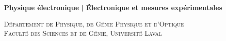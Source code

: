 %
\begin{center}
    \textbf{\large{Physique électronique | Électronique et mesures expérimentales}}\par
    \textsc{Département de Physique, de Génie Physique et d'Optique\\
    Faculté des Sciences et de Génie, Université Laval}\par
\end{center}